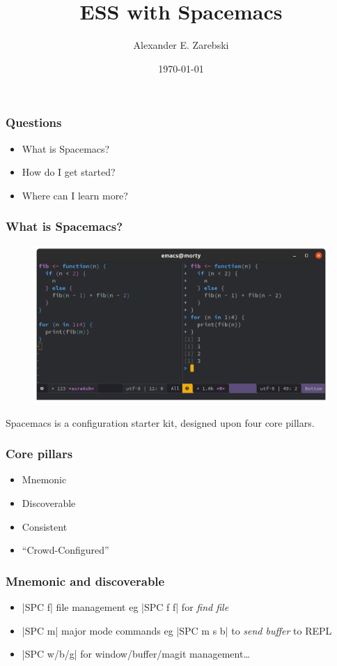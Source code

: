 \documentclass[presentation]{beamer}
\author{Alexander E. Zarebski}
\date{\today}
\title{ESS with Spacemacs}
\begin{document}
\maketitle

\begin{frame}
  \frametitle{Questions}
  \begin{itemize}
  \item What is Spacemacs?
  \item How do I get started?
  \item Where can I learn more?
  \end{itemize}
\end{frame}

\begin{frame}
  \frametitle{What is Spacemacs?}
  
  \begin{figure}
    \centering
    \includegraphics[width=.7\linewidth]{spacemacs-ess-demo}
  \end{figure}
  
  Spacemacs is a configuration starter kit, designed upon four core pillars.
\end{frame}

\begin{frame}
  \frametitle{Core pillars}
 \begin{itemize}
 \item Mnemonic
 \item Discoverable
 \item Consistent
 \item ``Crowd-Configured''
 \end{itemize} 
\end{frame}


\begin{frame}[fragile]
  \frametitle{Mnemonic and discoverable}

  \begin{itemize}
  \item \bverb|SPC f| file management eg \bverb|SPC f f| for \emph{find file}
  \item \bverb|SPC m| major mode commands eg \bverb|SPC m s b| to \emph{send buffer} to REPL
  \item \bverb|SPC w/b/g| for window/buffer/magit management\dots
  \end{itemize} 
\end{frame}
\end{document}

